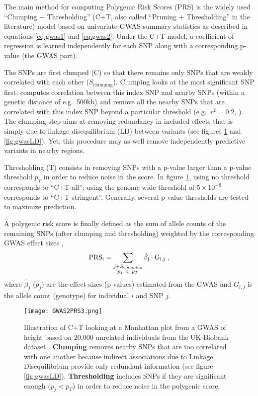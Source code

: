 The main method for computing Polygenic Risk Scores (PRS) is the widely used ``Clumping + Thresholding'' (C+T, also called ``Pruning + Thresholding'' in the literature) model based on univariate GWAS summary statistics as described in equations \eqref{eq:gwas1} and \eqref{eq:gwas2}.
Under the C+T model, a coefficient of regression is learned independently for each SNP along with a corresponding p-value (the GWAS part). 

The SNPs are first clumped (C) so that there remains only SNPs that are weakly correlated with each other ($S_\text{clumping}$). Clumping looks at the most significant SNP first, computes correlation between this index SNP and nearby SNPs (within a genetic distance of e.g.\ 500kb) and remove all the nearby SNPs that are correlated with this index SNP beyond a particular threshold (e.g.\ $r^2 = 0.2$, \cite{wray2014research}). 
The clumping step aims at removing redundancy in included effects that is simply due to linkage disequilibrium (LD) between variants (see figures \ref{fig:gwas2} and \ref{fig:gwasLD}). Yet, this procedure may as well remove independently predictive variants in nearby regions.

Thresholding (T) consists in removing SNPs with a p-value larger than a p-value threshold $p_T$ in order to reduce noise in the score.
In figure \ref{fig:gwas2}, using no threshold corresponds to ``C+T-all''; using the genome-wide threshold of $5 \times 10^{-8}$ corresponds to ``C+T-stringent''. Generally, several p-value thresholds are tested to maximize prediction. 

A polygenic risk score is finally defined as the sum of allele counts of the remaining SNPs (after clumping and thresholding) weighted by the corresponding GWAS effect sizes \cite[]{purcell2009common,Dudbridge2013,wray2014research,Euesden2015},
\[\rm{PRS}_i = \sum_{\substack{j \in S_\text{clumping} \\ p_j~<~p_T}} \hat\beta_j \cdot G_{i,j}~,\] where $\hat\beta_j$ ($p_j$) are the effect sizes (p-values) estimated from the GWAS and $G_{i,j}$ is the allele count (genotype) for individual $i$ and SNP $j$.

\begin{figure}[htb]
\centerline{\texttt{[image: GWAS2PRS3.png]}}
\caption{Illustration of C+T looking at a Manhattan plot from a GWAS of height based on 20,000 unrelated individuals from the UK Biobank dataset \cite[]{bycroft2017genome}. \textbf{\color{clumping}Clumping} removes nearby SNPs that are too correlated with one another because indirect associations due to Linkage Disequilibrium provide only redundant information (see figure \ref{fig:gwasLD}). \textbf{\color{thresholding}Thresholding} includes SNPs if they are significant enough ($p_j < p_T$) in order to reduce noise in the polygenic score.}\label{fig:gwas2}
\end{figure}

